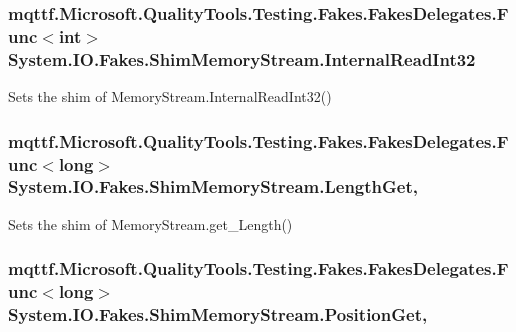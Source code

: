 \hypertarget{class_system_1_1_i_o_1_1_fakes_1_1_shim_memory_stream_a998bb87a46a82d3fcf753ab574727fbc}{
\subsubsection[{Internal\-Read\-Int32}]{\setlength{\rightskip}{0pt plus 5cm}mqttf.\-Microsoft.\-Quality\-Tools.\-Testing.\-Fakes.\-Fakes\-Delegates.\-Func$<$int$>$ System.\-I\-O.\-Fakes.\-Shim\-Memory\-Stream.\-Internal\-Read\-Int32\hspace{0.3cm}{\ttfamily [set]}}}\label{class_system_1_1_i_o_1_1_fakes_1_1_shim_memory_stream_a998bb87a46a82d3fcf753ab574727fbc}


Sets the shim of Memory\-Stream.\-Internal\-Read\-Int32()

\hypertarget{class_system_1_1_i_o_1_1_fakes_1_1_shim_memory_stream_ab167b650091939f97af121be5e314716}{
\subsubsection[{Length\-Get}]{\setlength{\rightskip}{0pt plus 5cm}mqttf.\-Microsoft.\-Quality\-Tools.\-Testing.\-Fakes.\-Fakes\-Delegates.\-Func$<$long$>$ System.\-I\-O.\-Fakes.\-Shim\-Memory\-Stream.\-Length\-Get\hspace{0.3cm}{\ttfamily [get]}, {\ttfamily [set]}}}\label{class_system_1_1_i_o_1_1_fakes_1_1_shim_memory_stream_ab167b650091939f97af121be5e314716}


Sets the shim of Memory\-Stream.\-get\-\_\-\-Length()

\hypertarget{class_system_1_1_i_o_1_1_fakes_1_1_shim_memory_stream_ac5c60e0e13bf6c303376ad4d7084ae5a}{
\subsubsection[{Position\-Get}]{\setlength{\rightskip}{0pt plus 5cm}mqttf.\-Microsoft.\-Quality\-Tools.\-Testing.\-Fakes.\-Fakes\-Delegates.\-Func$<$long$>$ System.\-I\-O.\-Fakes.\-Shim\-Memory\-Stream.\-Position\-Get\hspace{0.3cm}{\ttfamily [get]}, {\ttfamily [set]}}}\label{class_system_1_1_i_o_1_1_fakes_1_1_shim_memory_stream_ac5c60e0e13bf6c303376ad4d7084ae5a}


